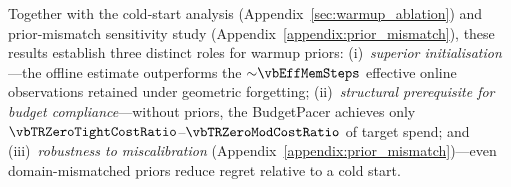 Together with the cold-start analysis
(Appendix~\ref{sec:warmup_ablation}) and prior-mismatch sensitivity
study (Appendix~\ref{appendix:prior_mismatch}), these results
establish three distinct roles for warmup priors:
(i)~\emph{superior initialisation}---the offline estimate outperforms
the ${\sim}\vbEffMemSteps$ effective online observations retained under geometric
forgetting;
(ii)~\emph{structural prerequisite for budget compliance}---without
priors, the BudgetPacer achieves only
$\vbTRZeroTightCostRatio$--$\vbTRZeroModCostRatio$ of target spend;
and (iii)~\emph{robustness to miscalibration}
(Appendix~\ref{appendix:prior_mismatch})---even domain-mismatched
priors reduce regret relative to a cold start.

\begin{table}[t]
\centering
\caption{Validation burn-in ablation---unconstrained regime (20~seeds,
held-out test split).
\emph{Regret} is cumulative over all 1{,}824 test steps;
\emph{R@200} is cumulative regret at test step~200 (an early-performance
diagnostic).
$\Delta$ is relative to the 100\% burn-in reference.
Less burn-in yields lower regret because intact priors
($n_\mathit{eff}{=}\vbNeff$, trained on 8{,}374 examples)
outperform the ${\sim}\vbEffMemSteps$ effective online observations at
$\gamma{=}\vbGamma$.  $p$-values are Bonferroni-corrected within the
regime (6~tests).}
\label{tab:val_burnin}
\small
{}
\end{table}


